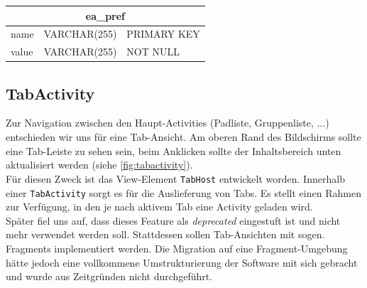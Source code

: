 \begin{table}[h!]
	\begin{center}
		\footnotesize
		\begin{tabular}{|p{2.5cm}|p{3.5cm}|p{3cm}|}
			\hline
			\multicolumn{3}{|c|}{\textbf{ea\_pref}} \\ \hline
			\hline
			name 	& VARCHAR(255) 	& PRIMARY KEY \\ \hline
			value 	& VARCHAR(255) 	& NOT NULL \\ \hline
		\end{tabular}
	\end{center}
\end{table}


\subsection{TabActivity}
Zur Navigation zwischen den Haupt-Activities (Padliste, Gruppenliste, ...) entschieden wir uns für eine Tab-Ansicht.
Am oberen Rand des Bildschirms sollte eine Tab-Leiste zu sehen sein, beim Anklicken sollte der Inhaltsbereich unten aktualisiert werden (siehe \autoref{fig:tabactivity}).\\
Für diesen Zweck ist das View-Element \texttt{TabHost} entwickelt worden.
Innerhalb einer \texttt{TabActivity} sorgt es für die Auslieferung von Tabs.
Es stellt einen Rahmen zur Verfügung, in den je nach aktivem Tab eine Activity geladen wird.\\
Später fiel uns auf, dass dieses Feature als \textit{deprecated} eingestuft ist und nicht mehr verwendet werden soll.
Stattdessen sollen Tab-Ansichten mit sogen. Fragments implementiert werden.
Die Migration auf eine Fragment-Umgebung hätte jedoch eine vollkommene Umstrukturierung der Software mit sich gebracht und wurde aus Zeitgründen nicht durchgeführt.

